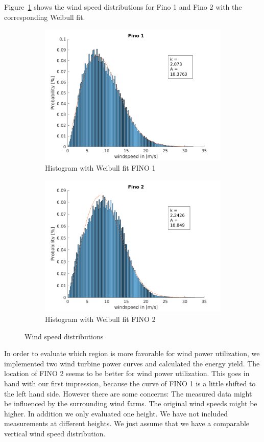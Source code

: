\documentclass[10pt]{article}
\begin{document}
Figure~\ref{fig:Histograms} shows the wind speed distributions for Fino 1 and Fino 2 with the corresponding Weibull fit.
\begin{figure}[H]
\begin{subfigure}{0.5\textwidth}
  \centering
  \includegraphics[width=1\linewidth]{../figures/Hist_withfit_Fino1.png}
  \caption{Histogram with Weibull fit FINO 1}
\end{subfigure}
\begin{subfigure}{0.5\textwidth}
  \centering
  \includegraphics[width=1\linewidth]{../figures/Hist_withfit_Fino2.png}
  \caption{Histogram with Weibull fit FINO 2}
\end{subfigure}
  \caption{Wind speed distributions}
\label{fig:Histograms}
\end{figure}
In order to evaluate which region is more favorable for wind power utilization, we implemented two wind turbine power curves and calculated the energy yield.
The location of FINO 2 seems to be better for wind power utilization. This goes in hand with our first impression, because the curve of FINO 1 is a little shifted to the left hand side. However there are some concerns: The measured data might be influenced by the surrounding wind farms. The original wind speeds might be higher. In addition we only evaluated one height. We have not included measurements at different heights. We just assume that we have a comparable vertical wind speed distribution. 
\newpage
\end{document}

